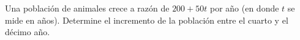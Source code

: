 \item Una población de animales crece a razón de $200 + 50t$ por año (en donde $t$ se mide en años). Determine el incremento de la población entre el cuarto y el décimo año.
